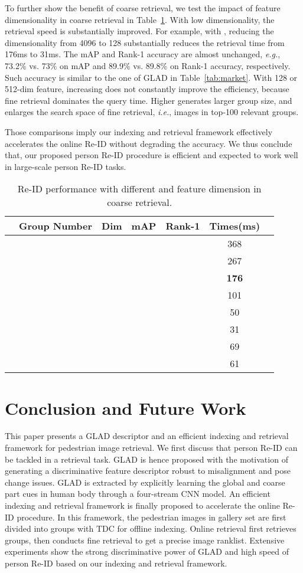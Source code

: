 \documentclass[sigconf]{acmart}
\begin{document}
To further show the benefit of coarse retrieval, we test the impact of feature dimensionality in coarse retrieval in Table~\ref{tab:TDC}. With low dimensionality, the retrieval speed is substantially improved. For example, with , reducing the dimensionality from 4096 to 128 substantially reduces the retrieval time from 176ms to 31ms. The mAP and Rank-1 accuracy are almost unchanged, \emph{e.g.}, 73.2\% vs. 73\% on mAP and 89.9\% vs. 89.8\% on Rank-1 accuracy, respectively. Such accuracy is similar to the one of GLAD in Table~\ref{tab:market}. With 128 or 512-dim feature, increasing  does not constantly improve the efficiency, because fine retrieval dominates the query time. Higher  generates larger group size, and enlarges the search space of fine retrieval,\emph{ i.e.}, images in top-100 relevant groups.

Those comparisons imply our indexing and retrieval framework effectively accelerates the online Re-ID without degrading the accuracy. We thus conclude that, our proposed person Re-ID procedure is efficient and expected to work well in large-scale person Re-ID tasks.

\begin{table}
\centering
\small
\caption{Re-ID performance with different  and feature dimension in coarse retrieval.}
\begin{tabular}{lcccccc}
\hline
 & Group Number & Dim &mAP &  Rank-1 &Times(ms)\\
\hline
 &    &  &   &   &368\\
 &  &  &   &   &267\\
 &    &   &  &  &{\bf176}\\
 &   &    &  &  &101\\
\hline
 &  &      &   &  &50 \\
 &  &      &   &  &31 \\
 &  &      &   &  &69 \\
 &  &      &   &  &61 \\
\hline
\end{tabular}
\label{tab:TDC}
\end{table}


\section{Conclusion and Future Work}
\label{sec:conclusion}
This paper presents a GLAD descriptor and an efficient indexing and retrieval framework for pedestrian image retrieval. We first discuss that person Re-ID can be tackled in a retrieval task. GLAD is hence proposed with the motivation of generating a discriminative feature descriptor robust to misalignment and pose change issues. GLAD is extracted by explicitly learning the global and coarse part cues in human body through a four-stream CNN model. An efficient indexing and retrieval framework is finally proposed to accelerate the online Re-ID procedure. In this framework, the pedestrian images in gallery set are first divided into groups with TDC for offline indexing. Online retrieval first retrieves groups, then conducts fine retrieval to get a precise image ranklist. Extensive experiments show the strong discriminative power of GLAD and high speed of person Re-ID based on our indexing and retrieval framework.
\end{document}
